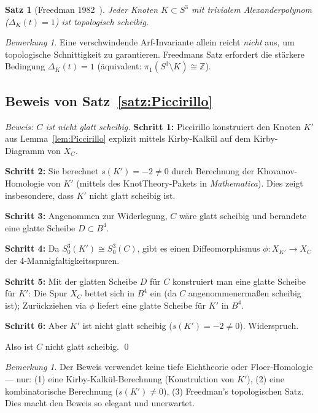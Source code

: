\documentclass[12pt,a4paper]{amsart}
\newtheorem{satz}[theorem]{Satz}
\theoremstyle{definition}
\theoremstyle{remark}
\newtheorem{bemerkung}[theorem]{Bemerkung}
\newcommand{\Z}{\mathbb{Z}}
\begin{document}
\begin{satz}[Freedman 1982~\cite{Freedman1982}]
Jeder Knoten $K \subset S^3$ mit trivialem Alexanderpolynom
($\Delta_K(t) = 1$) ist topologisch scheibig.
\end{satz}

\begin{bemerkung}
Eine verschwindende Arf-Invariante allein reicht \emph{nicht} aus, um
topologische Schnittigkeit zu garantieren. Freedmans Satz erfordert die
stärkere Bedingung $\Delta_K(t) = 1$ (äquivalent: $\pi_1(S^3 \setminus K) \cong \Z$).
\end{bemerkung}

\subsection{Beweis von Satz~\ref{satz:Piccirillo}}

\begin{proof}[Beweis: $C$ ist nicht glatt scheibig]
\textbf{Schritt 1:} Piccirillo konstruiert den Knoten $K'$ aus
Lemma~\ref{lem:Piccirillo} explizit mittels Kirby-Kalkül auf dem
Kirby-Diagramm von $X_C$.

\textbf{Schritt 2:} Sie berechnet $s(K') = -2 \neq 0$ durch Berechnung
der Khovanov-Homologie von $K'$ (mittels des KnotTheory-Pakets in
\textit{Mathematica}). Dies zeigt insbesondere, dass $K'$ nicht glatt
scheibig ist.

\textbf{Schritt 3:} Angenommen zur Widerlegung, $C$ wäre glatt scheibig
und berandete eine glatte Scheibe $D \subset B^4$.

\textbf{Schritt 4:} Da $S^3_0(K') \cong S^3_0(C)$, gibt es einen
Diffeomorphismus $\phi \colon X_{K'} \to X_C$ der 4-Mannigfaltigkeitsspuren.

\textbf{Schritt 5:} Mit der glatten Scheibe $D$ für $C$ konstruiert man
eine glatte Scheibe für $K'$: Die Spur $X_C$ bettet sich in $B^4$ ein
(da $C$ angenommenermaßen scheibig ist); Zurückziehen via $\phi$ liefert
eine glatte Scheibe für $K'$ in $B^4$.

\textbf{Schritt 6:} Aber $K'$ ist nicht glatt scheibig ($s(K') = -2 \neq 0$).
Widerspruch.

Also ist $C$ nicht glatt scheibig. \qed
\end{proof}

\begin{bemerkung}
Der Beweis verwendet keine tiefe Eichtheorie oder Floer-Homologie — nur:
(1) eine Kirby-Kalkül-Berechnung (Konstruktion von $K'$),
(2) eine kombinatorische Berechnung ($s(K') \neq 0$),
(3) Freedman's topologischen Satz.
Dies macht den Beweis so elegant und unerwartet.
\end{bemerkung}
\end{document}
